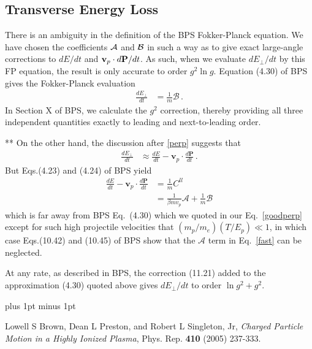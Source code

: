 \documentclass[preprint,12pt,eqsecnum,nofootinbib,amsmath,amssymb]{revtex4}
\newcommand{\bibskip}{\baselineskip16pt plus 1pt minus 1pt}
\begin{document}
\subsection{Transverse Energy Loss}


There is an ambiguity in the definition of the BPS Fokker-Planck
equation. We have chosen the coefficients ${\cal A}$ and ${\cal B}$
in such a way as to give exact large-angle corrections to $dE/dt$
and ${\bf v}_p \cdot d{\bf P}/dt$. As such, when we evaluate
$dE_\perp/dt$ by this FP equation, the result is only accurate
to order $g^2 \ln g$.
Equation (4.30) of BPS gives the Fokker-Planck evaluation
\begin{align}
\frac{d E_\perp}{dt} &= \frac{1}{m} \mathcal B \,.
\label{goodperp}
\end{align}
In Section X of BPS, we calculate the $g^2$ correction, thereby
providing all three independent quantities exactly to leading and
next-to-leading order.

**
On the other hand, the discussion after \eqref{perp} suggests that
\begin{align}
\frac{d E_\perp}{dt} &\approx \frac{d E}{dt} - 
    \mathbf v_p \cdot \frac{d \mathbf P}{dt} \,.
\label{badperp}
\end{align}
But Eqs.(4.23) and (4.24) of BPS yield 
\begin{align}
\frac{d E}{dt} - \mathbf v_p \cdot \frac{d \mathbf P}{dt} 
&= \frac{1}{m} C^{ll}
\nonumber\\[8pt]
 &= \frac{1}{\beta m v_p} \mathcal A + \frac{1}{m} \mathcal B
\label{fast}
\end{align}
which is far away from BPS Eq.~(4.30) which we quoted in our
Eq.~\eqref{goodperp} except for such high projectile velocities
that $(m_p/m_e) (T / E_p) \ll 1$, in which case Eqs.(10.42) and
(10.45) of BPS show that the $\mathcal A$ term in Eq.~\eqref{fast}
can be neglected. 

At any rate, as described in BPS, the correction (11.21) added to the
approximation (4.30) quoted above gives $d E_\perp /dt $ to order
$\ln g^2 + g^2$.   


%
%

\begin{thebibliography}{99}
\bibskip


           Lowell S Brown, Dean L Preston, and Robert L Singleton, Jr,
           {\it Charged Particle Motion in a Highly Ionized Plasma},
           Phys. Rep. {\bf 410} (2005) 237-333.




\end{thebibliography}
\end{document}
